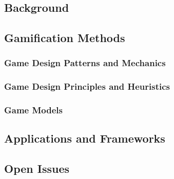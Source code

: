 \documentclass[10pt]{article}
\begin{document}
\subsection{Background}


\subsection{Gamification Methods}

\subsubsection{Game Design Patterns and Mechanics}

\subsubsection{Game Design Principles and Heuristics}

\subsubsection{Game Models}


\subsection{Applications and Frameworks}


\subsection{Open Issues}
\end{document}
